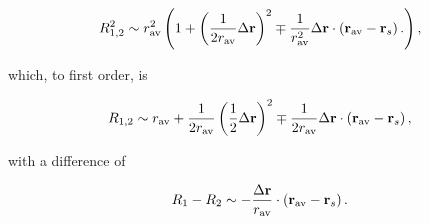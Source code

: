 {\begin{dmath}\label{eqn:lecture11VectorDifference:130}
R_{1,2}^2 \sim
r_{\text{av}}^2
\left(
1
+ \left(\inv{2 r_{\text{av}}} \Delta \Br \right)^2
\mp \inv{r_{\text{av}}^2} \Delta \Br \cdot \left(\Br_{\text{av}} - \Br_s\right) .
\right),
\end{dmath}

which, to first order, is

\begin{dmath}\label{eqn:lecture11VectorDifference:150}
R_{1,2} \sim
r_{\text{av}}
+ \inv{2 r_{\text{av}}} \left(\inv{2} \Delta \Br \right)^2
\mp \inv{2 r_{\text{av}}} \Delta \Br \cdot \left(\Br_{\text{av}} - \Br_s\right),
\end{dmath}

with a difference of

\begin{dmath}\label{eqn:lecture11VectorDifference:170}
R_1 - R_2 \sim
-\frac{\Delta \Br}{r_{\text{av}}} \cdot \left(\Br_{\text{av}} - \Br_s\right).
\end{dmath}

} %
